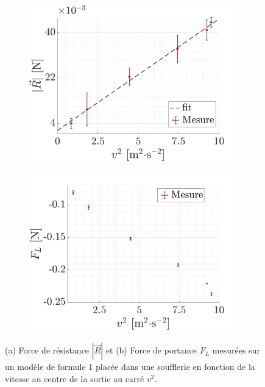 \documentclass[a4paper, 12pt,oneside]{article}
\begin{document}
\begin{figure}[H]
\begin{subfigure}{0.45\textwidth}  %
    \centering  %
    \includegraphics[scale=0.21]{Graphes/fig4.jpg}
    \captionsetup{justification = centering, font=large}
    \caption{}
    \label{fig4a}
\end{subfigure}
\hspace{0.05\textwidth}
\begin{subfigure}{0.45\textwidth}  %
    \centering  %
    \includegraphics[scale=0.21]{Graphes/fig5.jpg}
    \captionsetup{justification = centering, font=large}
    \caption{}
    \label{fig4b}
\end{subfigure}
\vspace{-0.3cm}
\captionsetup{justification=centering}
\caption{(a) Force de résistance $|\vec{R}|$ et (b) Force de portance $F_L$ mesurées sur un modèle de formule 1 placée dans une soufflerie en fonction de la vitesse au centre de la sortie au carré $v^2$.}
\label{fig1}
\end{figure}
\end{document}
